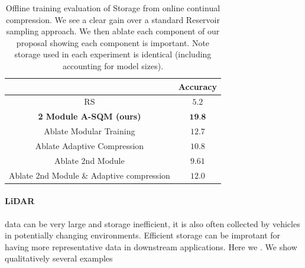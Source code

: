 \documentclass[colorinlistoftodos]{article} %
\newcommand\mynotesEB[1]{\textcolor{red}{#1}}
\begin{document}

\begin{table}
    \centering
    \begin{tabular}{c|c}
&Accuracy \\\hline
    RS &$5.2$\\
    \textbf{2 Module A-SQM (ours)} & $\textbf{19.8}$ \\\hline
    Ablate Modular Training & $12.7$ \\
    Ablate Adaptive Compression  & $10.8$ \\ %
    Ablate 2nd Module & $9.61$ \\
    Ablate 2nd Module \& Adaptive compression & $12.0$  \\ \hline

\end{tabular}
\caption{Offline training evaluation of Storage from online continual compression. We see a clear gain over a standard Reservoir sampling approach. We then ablate each component of our proposal showing each component is important. Note storage used in each experiment is identical (including accounting for model sizes).}\label{tab:offline}
\end{table}

\paragraph{LiDAR} data can be very large and storage inefficient, it is also often collected by vehicles in potentially changing environments. Efficient storage can be improtant for having more representative data in downstream applications. Here we . We show qualitatively several examples   
\end{document}
